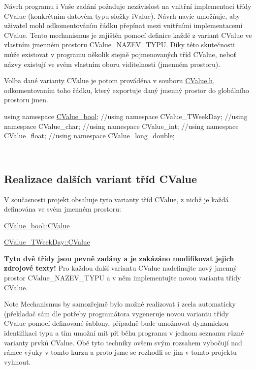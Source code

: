 Návrh programu i Vaše zadání požaduje nezávislost na vnitřní implementaci třídy {\ttfamily C\+Value} (konkrétním datovém typu složky {\ttfamily i\+Value}). Návrh navíc umožňuje, aby uživatel mohl odkomentováním řádku přepínat mezi vnitřními implementacemi {\ttfamily C\+Value}. Tento mechanismus je zajištěn pomocí definice každé z variant {\ttfamily C\+Value} ve vlastním jmenném prostoru {\ttfamily C\+Value\+\_\+\+N\+A\+Z\+E\+V\+\_\+\+T\+Y\+PU}. Díky této skutečnosti může existovat v programu několik stejně pojmenovaných tříd {\ttfamily C\+Value}, neboť názvy existují ve svém vlastním oboru viditelnosti (jmenném prostoru).

Volba dané varianty {\ttfamily C\+Value} je potom prováděna v souboru \hyperlink{_c_value_8h}{C\+Value.\+h}, odkomentovaním toho řádku, který exportuje daný jmenný prostor do globálního prostoru jmen. 
\begin{DoxyCode}
\textcolor{keyword}{using namespace }\hyperlink{namespace_c_value__bool}{CValue\_bool};
\textcolor{comment}{//using namespace CValue\_TWeekDay;}
\textcolor{comment}{//using namespace CValue\_char;}
\textcolor{comment}{//using namespace CValue\_int;}
\textcolor{comment}{//using namespace CValue\_float;}
\textcolor{comment}{//using namespace CValue\_long\_double;}
\end{DoxyCode}


~\newline
\subsection*{Realizace dalších variant tříd C\+Value}

V současnosti projekt obsahuje tyto varianty tříd {\ttfamily C\+Value}, z nichž je každá definována ve svém jmenném prostoru\+: \begin{DoxyItemize}
\item \hyperlink{class_c_value__bool_1_1_c_value}{C\+Value\+\_\+bool\+::\+C\+Value} \item \hyperlink{class_c_value___t_week_day_1_1_c_value}{C\+Value\+\_\+\+T\+Week\+Day\+::\+C\+Value}\end{DoxyItemize}
{\bfseries Tyto dvě třídy jsou pevně zadány a je zakázáno modifikovat jejich zdrojové texty!} Pro každou další variantu {\ttfamily C\+Value} nadefinujte nový jmenný prostor {\ttfamily C\+Value\+\_\+\+N\+A\+Z\+E\+V\+\_\+\+T\+Y\+PU} a v něm implementujte novou variantu třídy {\ttfamily C\+Value}. \begin{DoxyNote}{Note}
Mechanismus by samozřejmě bylo možné realizovat i zcela automaticky (překladač sám dle potřeby programátora vygeneruje novou variantu třídy {\ttfamily C\+Value} pomocí definované šablony, případně bude umožnovat dynamickou identifikaci typu a tím umožní mít při běhu programu v jednom seznamu různé varianty prvků {\ttfamily C\+Value}. Obě tyto techniky ovšem svým rozsahem vybočují nad rámec výuky v tomto kurzu a proto jsme se rozhodli se jim v tomto projektu vyhnout.
\end{DoxyNote}
~\newline
